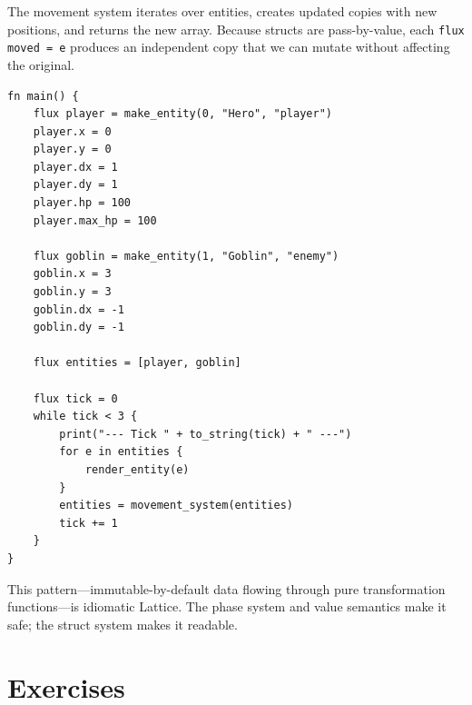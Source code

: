The movement system iterates over entities, creates updated copies with new
positions, and returns the new array. Because structs are pass-by-value,
each \lstinline|flux moved = e| produces an independent copy that we can
mutate without affecting the original.

\begin{lstlisting}[language=Lattice, caption={Running the ECS simulation}]
fn main() {
    flux player = make_entity(0, "Hero", "player")
    player.x = 0
    player.y = 0
    player.dx = 1
    player.dy = 1
    player.hp = 100
    player.max_hp = 100

    flux goblin = make_entity(1, "Goblin", "enemy")
    goblin.x = 3
    goblin.y = 3
    goblin.dx = -1
    goblin.dy = -1

    flux entities = [player, goblin]

    flux tick = 0
    while tick < 3 {
        print("--- Tick " + to_string(tick) + " ---")
        for e in entities {
            render_entity(e)
        }
        entities = movement_system(entities)
        tick += 1
    }
}
\end{lstlisting}

This pattern---immutable-by-default data flowing through pure transformation
functions---is idiomatic Lattice. The phase system and value semantics make
it safe; the struct system makes it readable.

\section{Exercises}\label{sec:struct-exercises}

